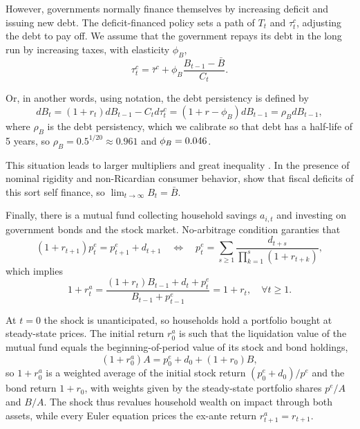 \documentclass[12pt]{article}
\begin{document}
However, governments normally finance themselves by increasing deficit and issuing new
debt. The deficit-financed policy sets a path of $T_t$ and $\tau^c_t$, adjusting the
debt to pay off. We assume that the government repays its debt in the long run by
increasing taxes, with elasticity $\phi_B$,
\[
\tau^c_t = \bar \tau^c + \phi_B \frac{B_{t-1} - \bar B}{C_t}.
\]

Or, in another words, using \textcite{auclert2025fiscal} notation, the debt persistency
is defined by
\[
dB_t = (1+r_t) dB_{t-1} - C_t d\tau^c_t = (1 + r - \phi_B) dB_{t-1} = \rho_B dB_{t-1},
\]
where $\rho_B$ is the debt persistency, which we calibrate so that debt has a half-life
of 5 years, so $\rho_B = {0.5}^{1/20} \approx 0.961$ and $\phi_B = 0.046$.

This situation leads to larger multipliers and great inequality
\parencite{auclert2023trickling}. In the presence of nominal rigidity and non-Ricardian
consumer behavior, \textcite{angeletos2024can} show that fiscal deficits of this sort
self finance, so $\lim_{t\to\infty} B_t = \bar B$.

Finally, there is a mutual fund collecting household savings $a_{i,t}$ and investing on
government bonds and the stock market. No-arbitrage condition garanties that
\[
(1+r_{t+1}) p_t^e = p_{t+1}^e + d_{t+1} \quad \Leftrightarrow \quad
p_t^e = \sum_{s\geq 1} \frac{d_{t+s}}{\prod_{k=1}^s (1+r_{t+k})},
\]
which implies
\[
1+r_t^a = \frac{(1+r_t) B_{t-1} + d_t + p_t^e}{B_{t-1} + p_{t-1}^e} = 1+r_t,
\quad \forall t\geq 1.
\]

At $t=0$ the shock is unanticipated, so households hold a portfolio bought at
steady-state prices. The initial return $r_0^a$ is such that the liquidation value of
the mutual fund equals the beginning-of-period value of its stock and bond holdings,
\[
(1+r_0^a) A = p_0^e + d_0 + (1+r_0) B,
\]
so $1+r_0^a$ is a weighted average of the initial stock return $(p_0^e+d_0)/p^e$ and the
bond return $1+r_0$, with weights given by the steady-state portfolio shares $p^e/A$ and
$B/A$. The shock thus revalues household wealth on impact through both assets, while
every Euler equation prices the ex-ante return $r_{t+1}^a = r_{t+1}$.

\end{document}

